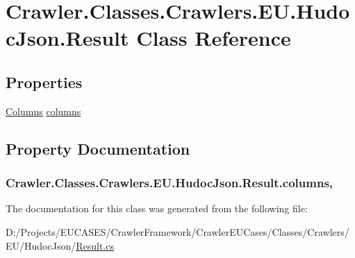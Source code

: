 \hypertarget{class_crawler_1_1_classes_1_1_crawlers_1_1_e_u_1_1_hudoc_json_1_1_result}{\section{Crawler.\-Classes.\-Crawlers.\-E\-U.\-Hudoc\-Json.\-Result Class Reference}
\label{class_crawler_1_1_classes_1_1_crawlers_1_1_e_u_1_1_hudoc_json_1_1_result}
}
\subsection*{Properties}
\begin{DoxyCompactItemize}
\item 
\hyperlink{class_crawler_1_1_classes_1_1_crawlers_1_1_e_u_1_1_hudoc_json_1_1_columns}{Columns} \hyperlink{class_crawler_1_1_classes_1_1_crawlers_1_1_e_u_1_1_hudoc_json_1_1_result_a1a3c8160bf3f1b871073c2734310357a}{columns}
\end{DoxyCompactItemize}


\subsection{Property Documentation}
\hypertarget{class_crawler_1_1_classes_1_1_crawlers_1_1_e_u_1_1_hudoc_json_1_1_result_a1a3c8160bf3f1b871073c2734310357a}{
\subsubsection[{columns}]{ Crawler.\-Classes.\-Crawlers.\-E\-U.\-Hudoc\-Json.\-Result.\-columns\hspace{0.3cm}{\ttfamily [get]}, {\ttfamily [set]}}}\label{class_crawler_1_1_classes_1_1_crawlers_1_1_e_u_1_1_hudoc_json_1_1_result_a1a3c8160bf3f1b871073c2734310357a}


The documentation for this class was generated from the following file\-:\begin{DoxyCompactItemize}
\item 
D\-:/\-Projects/\-E\-U\-C\-A\-S\-E\-S/\-Crawler\-Framework/\-Crawler\-E\-U\-Cases/\-Classes/\-Crawlers/\-E\-U/\-Hudoc\-Json/\hyperlink{_result_8cs}{Result.\-cs}\end{DoxyCompactItemize}
